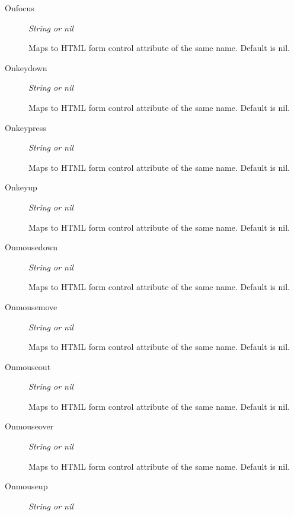 \documentclass [11pt]{book}
\begin{document}
\begin{itemize}
\begin{description}
\item [Onfocus]
\emph{String or nil}

 Maps to HTML form control attribute of the same name. Default is nil.




\item [Onkeydown]
\emph{String or nil}

 Maps to HTML form control attribute of the same name. Default is nil.




\item [Onkeypress]
\emph{String or nil}

 Maps to HTML form control attribute of the same name. Default is nil.




\item [Onkeyup]
\emph{String or nil}

 Maps to HTML form control attribute of the same name. Default is nil.




\item [Onmousedown]
\emph{String or nil}

 Maps to HTML form control attribute of the same name. Default is nil.




\item [Onmousemove]
\emph{String or nil}

 Maps to HTML form control attribute of the same name. Default is nil.




\item [Onmouseout]
\emph{String or nil}

 Maps to HTML form control attribute of the same name. Default is nil.




\item [Onmouseover]
\emph{String or nil}

 Maps to HTML form control attribute of the same name. Default is nil.




\item [Onmouseup]
\emph{String or nil}


\end{description}
\end{itemize}
\end{document}
